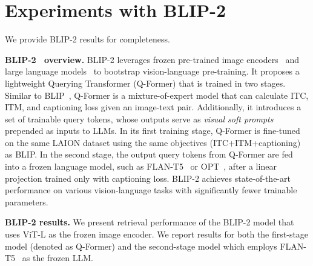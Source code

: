 \documentclass{article} \usepackage{iclr2024_conference,times}
\begin{document}
\section{Experiments with BLIP-2}
\label{app:blip_2}
We provide BLIP-2 results for completeness.

{\bf BLIP-2~\citep{blip2} overview.} BLIP-2 leverages frozen pre-trained image encoders~\citep{fang2022eva} and large language models~\citep{flan, opt} to bootstrap vision-language pre-training. It proposes a lightweight Querying Transformer (Q-Former) that is trained in two stages. Similar to BLIP~\citep{blip}, Q-Former is a mixture-of-expert model that can calculate ITC, ITM, and captioning loss given an image-text pair. Additionally, it introduces a set of trainable query tokens, whose outputs serve as {\em visual soft prompts} prepended as inputs to LLMs. In its first training stage, Q-Former is fine-tuned on the same LAION dataset using the same objectives (ITC+ITM+captioning) as BLIP. In the second stage, the output query tokens from Q-Former are fed into a frozen language model, such as FLAN-T5~\citep{flan} or OPT~\citep{flan}, after a linear projection trained only with captioning loss. BLIP-2 achieves state-of-the-art performance on various vision-language tasks with significantly fewer trainable parameters.  


{\bf BLIP-2 results.} We present retrieval performance of the BLIP-2 model that uses ViT-L as the frozen image encoder. We report results for both the first-stage model (denoted as Q-Former) and the second-stage model which employs FLAN-T5~\citep{flan} as the frozen LLM. 
\end{document}
